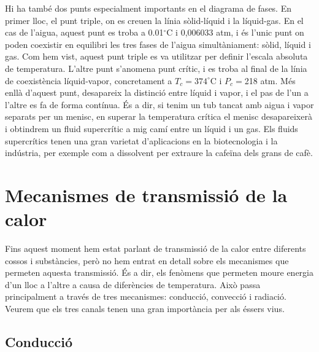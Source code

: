 \documentclass[12pt]{book}
\begin{document}
Hi ha també dos punts especialment importants en el diagrama de fases. En primer lloc, el punt triple, on es creuen la línia sòlid-líquid i la líquid-gas. En el cas de l'aigua, aquest punt es troba a 0.01$^\circ$C i 0,006033 atm, i és l'unic punt on poden coexistir en equilibri les tres fases de l'aigua simultàniament: sòlid, líquid i gas. Com hem vist, aquest punt triple es va utilitzar per definir l'escala absoluta de temperatura. L'altre punt s'anomena punt crític, i es troba al final de la línia de coexistència líquid-vapor, concretament a $T_c = 374 ^\circ $C i $P_c = $218 atm. Més enllà d'aquest punt, desapareix la distinció entre líquid i vapor, i el pas de l'un a l'altre es fa de forma contínua. És a dir, si tenim un tub tancat amb aigua i vapor separats per un menisc, en superar la temperatura crítica el menisc desapareixerà i obtindrem un fluid supercrític a mig camí entre un líquid i un gas. Els fluids supercrítics tenen una gran varietat d'aplicacions en la biotecnologia i la indústria, per exemple com a dissolvent per extraure la cafeïna dels grans de cafè.

\section{Mecanismes de transmissió de la calor}

Fins aquest moment hem estat parlant de transmissió de la calor entre diferents cossos i substàncies, però no hem entrat en detall sobre els mecanismes que permeten aquesta transmissió. És a dir, els fenòmens que permeten moure energia d'un lloc a l'altre a causa de diferències de temperatura. Això passa principalment a través de tres mecanismes: conducció, convecció i radiació. Veurem que els tres canals tenen una gran importància per als éssers vius.

\subsection{Conducció}
\end{document}
